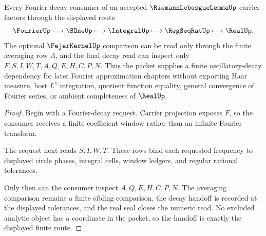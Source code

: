 \begin{theorem}
\label{thm:riemann-lebesgue-lemma-oscillatory-handoff}
Every Fourier-decay consumer of an accepted $\RiemannLebesgueLemmaUp$ carrier factors through the displayed route
$$
\FourierUp \longmapsto \SOneUp \longmapsto \IntegralUp \longmapsto \RegSeqRatUp \longmapsto \RealUp .
$$
The optional $\FejerKernelUp$ comparison can be read only through the finite averaging row $A$, and the final decay read can inspect only $F,S,I,W,T,A,Q,E,H,C,P,N$. Thus the packet supplies a finite oscillatory-decay dependency for later Fourier approximation chapters without exporting Haar measure, host $L^{1}$ integration, quotient function equality, general convergence of Fourier series, or ambient completeness of $\RealUp$.
\end{theorem}
\begin{proof}
Begin with a Fourier-decay request. Carrier projection exposes $F$, so the consumer receives a finite coefficient window rather than an infinite Fourier transform.

The request next reads $S,I,W,T$. These rows bind each requested frequency to displayed circle phases, integral cells, window ledgers, and regular rational tolerances.

Only then can the consumer inspect $A,Q,E,H,C,P,N$. The averaging comparison remains a finite sibling comparison, the decay handoff is recorded at the displayed tolerances, and the real seal closes the numeric read. No excluded analytic object has a coordinate in the packet, so the handoff is exactly the displayed finite route.
\end{proof}




